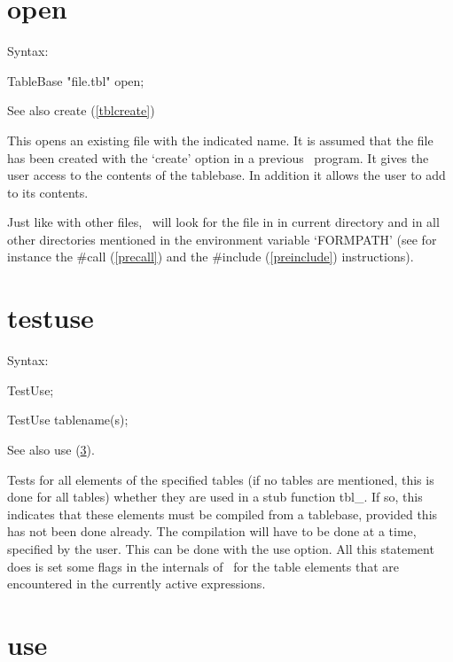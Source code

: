 
\section{open}
\label{tblopen}

\noindent Syntax:

TableBase "file.tbl" open;

\noindent See also create (\ref{tblcreate})

\noindent This opens an existing file with the indicated name. 
It is assumed that the file has been created with the 
`create' option in a previous \FORM\ program. It gives the user access to the 
contents of the tablebase. In addition it allows the user to add to its 
contents.

\noindent Just like with other files, \FORM\ will look for the file in in 
current directory and in all other directories mentioned in the environment 
variable `FORMPATH' (see for instance the 
\#call (\ref{precall}) and the \#include 
(\ref{preinclude}) instructions).


\section{testuse}
\label{tbltestuse}

\noindent Syntax:

TestUse;

TestUse tablename(s);

\noindent See also use (\ref{tbluse}).

\noindent Tests for all elements of the specified tables (if 
no tables are mentioned, this is done for all tables) whether they are used 
in a stub function tbl\_. If so, this indicates 
that these elements must be compiled from a tablebase, provided this has 
not been done already. The compilation will have to be done at a time, 
specified by the user. This can be done with the use option. All 
this statement does is set some flags in the internals of \FORM\ for the 
table elements that are encountered in the currently active expressions.


\section{use}
\label{tbluse}


